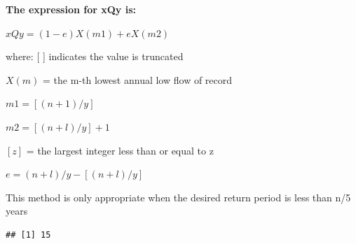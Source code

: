 \documentclass[
]{book}
\newenvironment{Shaded}{\begin{snugshade}}{\end{snugshade}}
\newcommand{\DecValTok}[1]{\textcolor[rgb]{0.00,0.00,0.81}{#1}}
\newcommand{\FunctionTok}[1]{\textcolor[rgb]{0.00,0.00,0.00}{#1}}
\newcommand{\NormalTok}[1]{#1}
\newcommand{\OtherTok}[1]{\textcolor[rgb]{0.56,0.35,0.01}{#1}}
\newcommand{\SpecialCharTok}[1]{\textcolor[rgb]{0.00,0.00,0.00}{#1}}
\begin{document}
\textbf{The expression for xQy is:}

\(xQy = (1-e) X(m1) + eX(m2)\)

where:
{[} {]} indicates the value is truncated

\(X(m)\) = the m-th lowest annual low flow of record

\(m1 = [(n+1)/y]\)

\(m2 = [(n+l)/y] + 1\)

\([z]\) = the largest integer less than or equal to z

\(e = (n+l)/y - [(n+l)/y]\)

This method is only appropriate when the desired return period is less than n/5 years

\begin{Shaded}
\end{Shaded}

\begin{verbatim}
## [1] 15
\end{verbatim}
\end{document}
